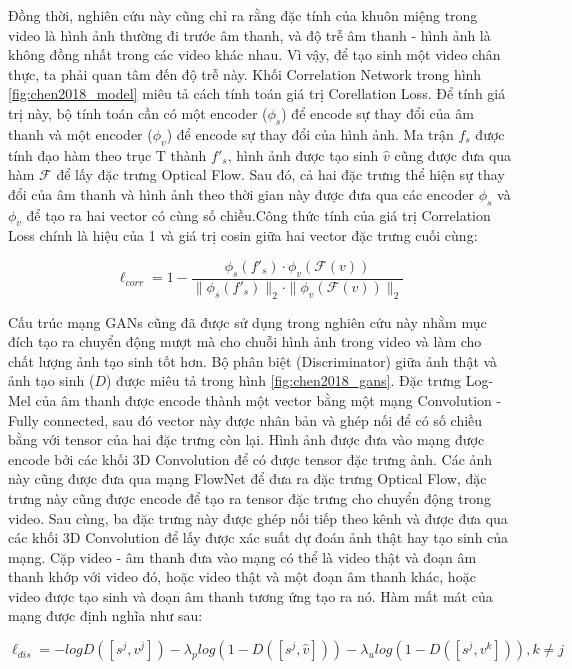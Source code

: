 Đồng thời, nghiên cứu này cũng chỉ ra rằng đặc tính của khuôn miệng trong video là hình ảnh thường đi trước âm thanh, và độ trễ âm thanh - hình ảnh là không đồng nhất trong các video khác nhau. Vì vậy, để tạo sinh một video chân thực, ta phải quan tâm đến độ trễ này. Khối Correlation Network trong hình \ref{fig:chen2018_model} miêu tả cách tính toán giá trị Corellation Loss. Để tính giá trị này, bộ tính toán cần có một encoder ($\phi_s$) để encode sự thay đổi của âm thanh và một encoder ($\phi_v$) để encode sự thay đổi của hình ảnh. Ma trận $f_s$ được tính đạo hàm theo trục T thành $f'_s$, hình ảnh được tạo sinh $\hat{v}$ cũng được đưa qua hàm $\mathcal{F}$ để lấy đặc trưng Optical Flow. Sau đó, cả hai đặc trưng thể hiện sự thay đổi của âm thanh và hình ảnh theo thời gian này được đưa qua các encoder $\phi_s$ và $\phi_v$ để tạo ra hai vector có cùng số chiều.Công thức tính của giá trị Correlation Loss chính là hiệu của 1 và giá trị cosin giữa hai vector đặc trưng cuối cùng:

\begin{equation}
    \ell_{corr} = 1 - \frac{\phi_s(f'_s)\cdot\phi_v(\mathcal{F}(v))}{\|\phi_s(f'_s)\|_2\cdot\|\phi_v(\mathcal{F}(v))\|_2}
    \label{eqn:chen2018_corr_loss}
\end{equation}


Cấu trúc mạng GANs cũng đã được sử dụng trong nghiên cứu này nhằm mục đích tạo ra chuyển động mượt mà cho chuỗi hình ảnh trong video và làm cho chất lượng ảnh tạo sinh tốt hơn. Bộ phân biệt (Discriminator) giữa ảnh thật và ảnh tạo sinh ($D$) được miêu tả trong hình \ref{fig:chen2018_gans}. Đặc trưng Log-Mel của âm thanh được encode thành một vector bằng một mạng Convolution - Fully connected, sau đó vector này được nhân bản và ghép nối để có số chiều bằng với tensor của hai đặc trưng còn lại. Hình ảnh được đưa vào mạng được encode bởi các khối 3D Convolution để có được tensor đặc trưng ảnh. Các ảnh này cũng được đưa qua mạng FlowNet để đưa ra đặc trưng Optical Flow, đặc trưng này cũng được encode để tạo ra tensor đặc trưng cho chuyển động trong video. Sau cùng, ba đặc trưng này được ghép nối tiếp theo kênh và được đưa qua các khối 3D Convolution để lấy được xác suất dự đoán ảnh thật hay tạo sinh của mạng. Cặp video - âm thanh đưa vào mạng có thể là video thật và đoạn âm thanh khớp với video đó, hoặc video thật và một đoạn âm thanh khác, hoặc video được tạo sinh và đoạn âm thanh tương ứng tạo ra nó. Hàm mất mát của mạng được định nghĩa như sau:

\begin{equation}
    \ell_{dis} = -logD([s^j, v^j]) - \lambda_plog(1 - D([s^j, \hat{v}])) - \lambda_ulog(1 - D([s^j, v^k])), k \ne j
\end{equation}

